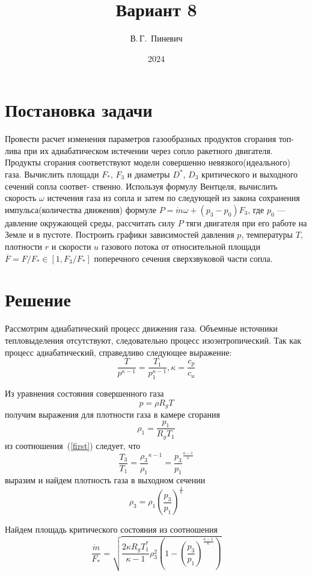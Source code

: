 \documentclass[12pt, a4paper]{article}
\title{Вариант 8}
\author{В.\,Г.~Пиневич}
\date{2024}
\begin{document}
\maketitle

\tableofcontents



\newpage

\section{Постановка задачи}
Провести расчет изменения параметров газообразных продуктов сгорания топ-
лива при их адиабатическом истечении через сопло ракетного двигателя. Продукты
сгорания соответствуют модели совершенно невязкого(идеального) газа. Вычислить
площади $F_*$, $F_3$ и диаметры $D^*$, $D_3$ критического и выходного сечений сопла соответ-
ственно. Используя формулу Вентцеля, вычислить скорость $\omega$ истечения газа
из сопла и затем по следующей из закона сохранения импульса(количества движения) формуле $P = \dot{m} \omega + \left(p_3 - p_0\right)F_3$, где $p_0$ --- давление окружающей среды, рассчитать
силу $P$ тяги двигателя при его работе на Земле и в пустоте. Построить графики зависимостей давления $p$, температуры $T$, плотности $r$ и скорости $u$ газового потока от относительной площади $\overline{F} = F / F_* \in [1, F_3 / F_*]$ поперечного сечения сверхзвуковой
части сопла.

\section{Решение}
Рассмотрим адиабатический процесс движения газа. Объемные источники тепловыделения отсутствуют, следовательно процесс изоэнтропический. Так как процесс
адиабатический, справедливо следующее выражение:
\begin{equation}
	\label{first}
\frac{T}{p^{\kappa - 1}} = \frac{T_1}{p^{\kappa - 1}_1}, \kappa = \frac{c_p}{c_u}
\end{equation}

Из уравнения состояния совершенного газа
\[
p = \rho R_g T
\]
\noindent получим выражения для плотности газа в камере сгорания 
\[
\rho_1 = \frac{p_1}{R_g T_1}
\]
из соотношения~(\ref{first}) следует, что
\[
\frac{T_3}{T_1} = \frac{\rho_3}{\rho_1}^{\kappa - 1} = \frac{p_3}{p_1}^{\frac{\kappa - 1}{\kappa}}
\]
выразим и найдем плотность газа в выходном сечении
\[
\rho_3 = \rho_1 \left(\frac{p_3}{p_1}\right)^{\frac{1}{\kappa}}
\]

Найдем площадь критического состояния из соотношения
\[
\frac{\dot{m}}{F_*} = \sqrt{\frac{2 \kappa R_g T_1^*}{\kappa - 1} \rho_3^2 \left(1 - {\left(\frac{p_3}{p_1}\right)}^{\frac{\kappa - 1}{\kappa}} \right)}
\]
\end{document}
